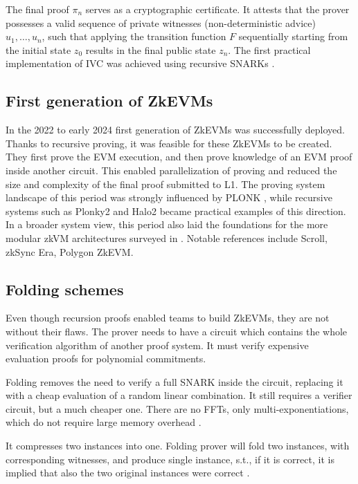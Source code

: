 The final proof $\pi_n$ serves as a cryptographic certificate. It attests that
the prover possesses a valid sequence of private witnesses (non-deterministic
advice) $u_1, \ldots, u_n$, such that applying the transition function $F$
sequentially starting from the initial state $z_0$ results in the final public
state $z_n$. The first practical implementation of IVC was achieved using
recursive SNARKs \cite{RecursiveSNARKsIVC}.

\subsection{First generation of ZkEVMs}

In the 2022 to early 2024 first generation of ZkEVMs was successfully deployed.
Thanks to recursive proving, it was feasible for these ZkEVMs to be created.
They first prove the EVM execution, and then prove knowledge of an EVM proof inside another circuit.
This enabled parallelization of proving and reduced the size and complexity of
the final proof submitted to L1. The proving system landscape of this period was
strongly influenced by PLONK \cite{Plonk}, while recursive systems such as
Plonky2 \cite{Plonky2} and Halo2 \cite{Halo2} became practical examples of this
direction. In a broader system view, this period also laid the foundations for
the more modular zkVM architectures surveyed in \cite{SoKZkVMs}. Notable references
include Scroll, zkSync Era, Polygon ZkEVM.

\subsection{Folding schemes}

Even though recursion proofs enabled teams to build ZkEVMs, they are not without
their flaws. The prover needs to have a circuit which contains the whole verification
algorithm of another proof system. It must verify expensive evaluation proofs
for polynomial commitments.

Folding removes the need to verify a full SNARK inside the circuit, replacing
it with a cheap evaluation of a random linear combination. It
still requires a verifier circuit, but a much cheaper one.
There are no FFTs, only multi-exponentiations, which do not require large
memory overhead \cite{Nova}.

It compresses two instances into one. Folding prover will fold two instances,
with corresponding witnesses, and produce single instance, s.t., if it is correct,
it is implied that also the two original instances were correct \cite{Nova}.

